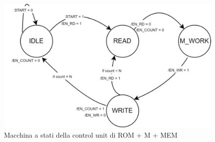 \begin{figure}[H]
	\centering
	\includegraphics[width=1\textwidth]{img/Automa_ROM_M_MEM.png}
	\caption{Macchina a stati della control unit di ROM + M + MEM}
	\label{automa_rom_m_mem} 
\end{figure}

